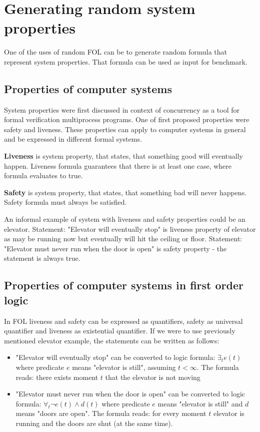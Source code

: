\chapter{Generating random system properties}

One of the uses of random \gls{FOL} can be to generate random formula that represent system properties. That formula can be used as input for benchmark.

\section{Properties of computer systems}

System properties were first discussed in context of concurrency \cite{Lampert77} as a tool for formal verification multiprocess programs. One of first proposed properties were safety and liveness. These properties can apply to computer systems in general and be expressed in different formal systems.

\textbf{Liveness} \cite{Klimek99} is system property, that states, that something good will eventually happen.
Liveness formula guarantees that there is at least one case, where formula evaluates to true.

\textbf{Safety} \cite{Klimek99} is system property, that states, that something bad will never happens.
Safety formula must always be satisfied.

An informal example of system with liveness and safety properties could be an elevator. Statement: "Elevator will eventually stop" is liveness property of elevator as may be running now but eventually will hit the ceiling or floor. Statement: "Elevator must never run when the door is open" is safety property - the statement is always true.

\section{Properties of computer systems in first order logic}

In \gls{FOL} liveness and safety can be expressed as quantifiers, safety as universal quantifier and liveness as existential quantifier. 
If we were to use previously mentioned elevator example, the statements can be written as follows:

\begin{itemize}
  \item "Elevator will eventually stop" can be converted to logic formula: $\exists_t e(t)$ where predicate $e$ means "elevator is still", assuming $t<\infty$. The formula reads: there exists moment $t$ that the elevator is not moving
  \item "Elevator must never run when the door is open" can be converted to logic formula: $\forall_t \neg e(t) \land d(t)$ where predicate $e$ means "elevator is still" and $d$ means "doors are open". The formula reads: for every moment $t$ elevator is running and the doors are shut (at the same time).
\end{itemize}

